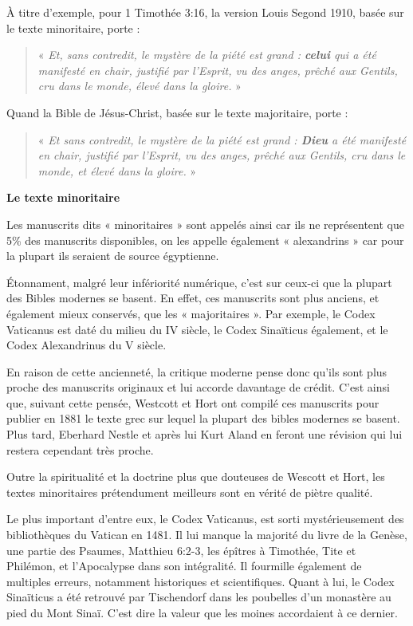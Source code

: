\begin{small}
À titre d'exemple, pour 1 Timothée 3:16, la version Louis Segond 1910, basée sur le texte minoritaire, porte :
\begin{quote}
« \emph{Et, sans contredit, le mystère de la piété est grand : \textbf{celui} qui a été manifesté en chair, justifié par l'Esprit, vu des anges, prêché aux Gentils, cru dans le monde, élevé dans la gloire.} »
\end{quote}

Quand la Bible de Jésus-Christ, basée sur le texte majoritaire, porte :
\begin{quote}
« \emph{Et sans contredit, le mystère de la piété est grand : \textbf{Dieu} a été manifesté en chair, justifié par l'Esprit, vu des anges, prêché aux Gentils, cru dans le monde, et élevé dans la gloire.} »\newline
\end{quote}

\textbf{Le texte minoritaire}\bigskip

Les manuscrits dits « minoritaires » sont appelés ainsi car ils ne représentent que 5\% des manuscrits disponibles, on les appelle également « alexandrins » car pour la plupart ils seraient de source égyptienne.\bigskip

Étonnament, malgré leur infériorité numérique, c'est sur ceux-ci que la plupart des Bibles modernes se basent. En effet, ces manuscrits sont plus anciens, et également mieux conservés, que les « majoritaires ». Par exemple, le Codex Vaticanus est daté du milieu du IV siècle, le Codex Sinaïticus également, et le Codex Alexandrinus du V siècle.\bigskip

En raison de cette ancienneté, la critique moderne pense donc qu'ils sont plus proche des manuscrits originaux et lui accorde davantage de crédit. C'est ainsi que, suivant cette pensée, Westcott et Hort ont compilé ces manuscrits pour publier en 1881 le texte grec sur lequel la plupart des bibles modernes se basent. Plus tard, Eberhard Nestle et après lui Kurt Aland en feront une révision qui lui restera cependant très proche.\bigskip

Outre la spiritualité et la doctrine plus que douteuses de Wescott et Hort, les textes minoritaires prétendument meilleurs sont en vérité de piètre qualité.\bigskip

Le plus important d'entre eux, le Codex Vaticanus, est sorti mystérieusement des bibliothèques du Vatican en 1481. Il lui manque la majorité du livre de la Genèse, une partie des Psaumes, Matthieu 6:2-3, les épîtres à Timothée, Tite et Philémon, et l'Apocalypse dans son intégralité. Il fourmille également de multiples erreurs, notamment historiques et scientifiques. Quant à lui, le Codex Sinaïticus a été retrouvé par Tischendorf dans les poubelles d'un monastère au pied du Mont Sinaï. C'est dire la valeur que les moines accordaient à ce dernier.\bigskip


\end{small}
